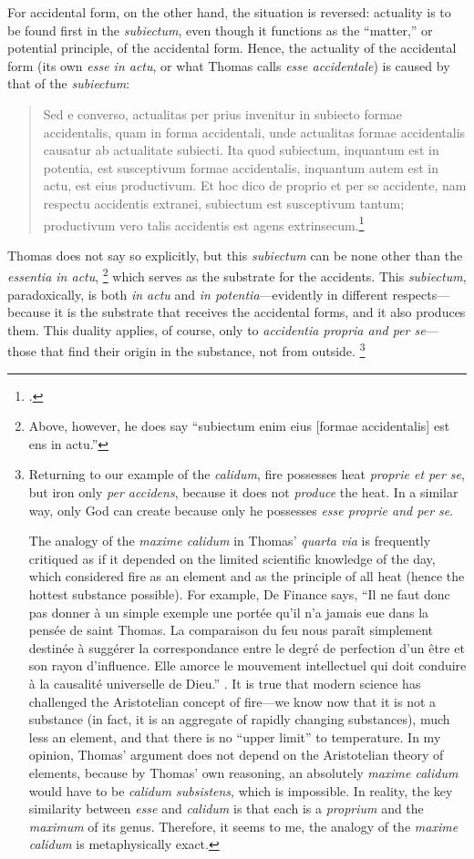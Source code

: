 For accidental form, on the other hand, the situation is reversed: actuality is to be found first in the \emph{subiectum}, even though it functions as the “matter,” or potential principle, of the accidental form. Hence, the actuality of the accidental form (its own \emph{esse in actu}, or what Thomas calls \emph{esse accidentale}) is caused by that of the \emph{subiectum}:
%
\begin{quotation}
Sed e converso, actualitas per prius invenitur in subiecto formae accidentalis, quam in forma accidentali, unde actualitas formae accidentalis causatur ab actualitate subiecti. Ita quod subiectum, inquantum est in potentia, est susceptivum formae accidentalis, inquantum autem est in actu, est eius productivum. Et hoc dico de proprio et per se accidente, nam respectu accidentis extranei, subiectum est susceptivum tantum; productivum vero talis accidentis est agens extrinsecum.\footcite[I, q.~77, a.~6, co.]{st:summa}
\end{quotation}
%
Thomas does not say so explicitly, but this \emph{subiectum} can be none other than the \emph{essentia in actu},%
%
\footnote{Above, however, he does say “subiectum enim eius [formae accidentalis] est ens in actu.”} which serves as the substrate for the accidents. This \emph{subiectum}, paradoxically, is both \emph{in actu} and \emph{in potentia}—evidently in different respects—because it is the substrate that receives the accidental forms, and it also produces them. This duality applies, of course, only to \emph{accidentia propria and per se}—those that find their origin in the substance, not from outside.%
%
\footnote{Returning to our example of the \emph{calidum}, fire possesses heat \emph{proprie et per se}, but iron only \emph{per accidens}, because it does not \emph{produce} the heat. In a similar way, only God can create because only he possesses \emph{esse proprie and per se}.

The analogy of the \emph{maxime calidum} in Thomas’ \emph{quarta via} is frequently critiqued as if it depended on the limited scientific knowledge of the day, which considered fire as an element and as the principle of all heat (hence the hottest substance possible). For example, De Finance says, “Il ne faut donc pas donner à un simple exemple une portée qu’il n’a jamais eue dans la pensée de saint Thomas. La comparaison du feu nous paraît simplement destinée à suggérer la correspondance entre le degré de perfection d’un être et son rayon d’influence. Elle amorce le mouvement intellectuel qui doit conduire à la causalité universelle de Dieu.” \parencite[125]{definance:etre-et-agir}. It is true that modern science has challenged the Aristotelian concept of fire—we know now that it is not a substance (in fact, it is an aggregate of rapidly changing substances), much less an element, and that there is no “upper limit” to temperature. In my opinion, Thomas’ argument does not depend on the Aristotelian theory of elements, because by Thomas’ own reasoning, an absolutely \emph{maxime calidum} would have to be \emph{calidum subsistens}, which is impossible. In reality, the key similarity between \emph{esse} and \emph{calidum} is that each is a \emph{proprium} and the \emph{maximum} of its genus. Therefore, it seems to me, the analogy of the \emph{maxime calidum} is metaphysically exact.}

